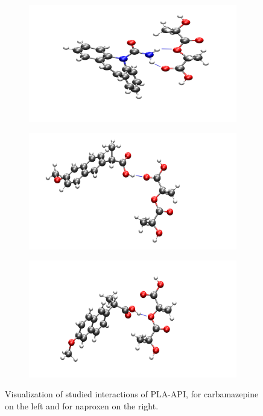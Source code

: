 \begin{figure}[htb]
	\begin{subfigure}{0.33\textwidth}
		\includegraphics[width=\linewidth]{img/cbz_interakce.png} 
	\end{subfigure}
	\begin{subfigure}{0.31\textwidth}
		\includegraphics[width=\linewidth]{img/nap1_interakce.png} 
	\end{subfigure}   	
	\begin{subfigure}{0.33\textwidth}
		\includegraphics[width=\linewidth]{img/nap2_interakce.png} 
	\end{subfigure}
	\caption{Visualization of studied interactions of PLA-API, for carbamazepine on the left and for naproxen on the right.}
	\label{fig:contact}    
\end{figure}


